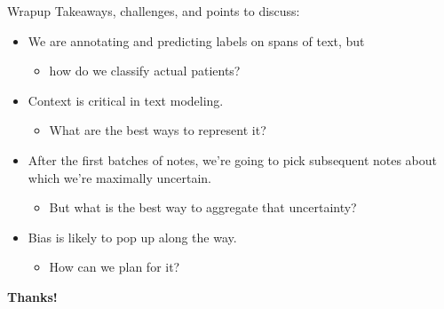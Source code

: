 \documentclass[10pt]{beamer}
\begin{document}
\begin{frame}{Wrapup}
Takeaways, challenges, and points to discuss:
\begin{itemize}
\item We are annotating and predicting labels on spans of text, but
	\begin{itemize}
	\item how do we classify actual patients?
	\end{itemize}		
\item Context is critical in text modeling.  
	\begin{itemize}
	\item What are the best ways to represent it?
	\end{itemize}		
\item After the first batches of notes, we're going to pick subsequent notes about which we're maximally uncertain.  
	\begin{itemize}
	\item But what is the best way to aggregate that uncertainty?
	\end{itemize}		
\item Bias is likely to pop up along the way.  
	\begin{itemize}
	\item How can we plan for it?
	\end{itemize}		

\end{itemize}
\end{frame}

\begin{frame}
\huge{\textbf{Thanks!}}
\end{frame}
\end{document}
